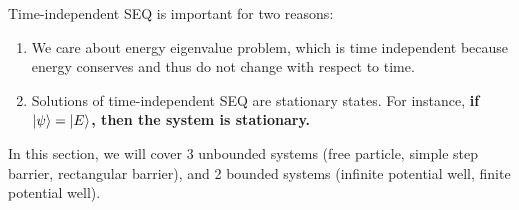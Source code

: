 \documentclass{school-22.101-notes}
\date{September 19, 2011}
\begin{document}
\maketitle

 \label{TISEQ}
Time-independent SEQ is important for two reasons:
\begin{enumerate}
\item We care about energy eigenvalue problem, which is time independent because energy conserves and thus do not change with respect to time. 
\item Solutions of time-independent SEQ are stationary states. For instance, \textbf{if $\left| \psi \right> = \left| E \right>$, then the system is stationary.}
\end{enumerate}
In this section, we will cover 3 unbounded systems (free particle, simple step barrier, rectangular barrier), and 2 bounded systems (infinite potential well, finite potential well). 
\end{document}
